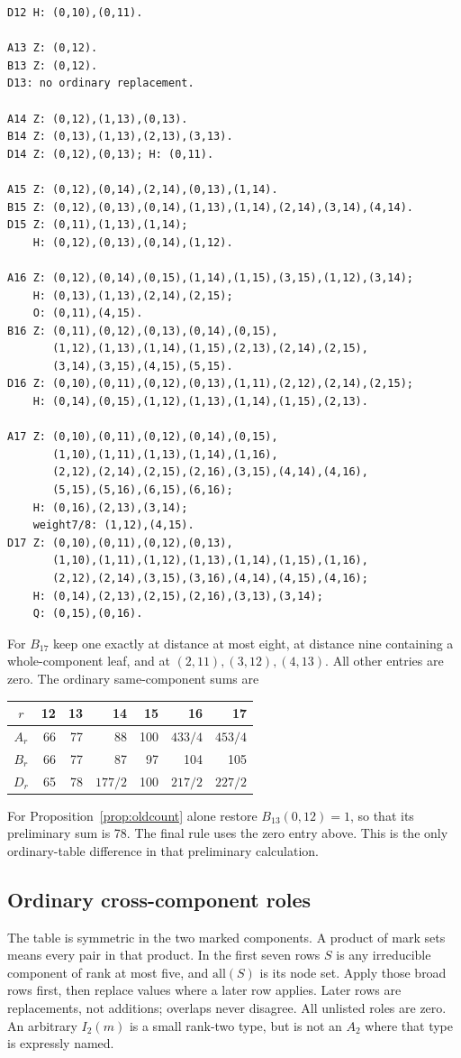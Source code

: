 \documentclass[11pt]{article}
\theoremstyle{remark}\newtheorem{remark}[theorem]{Remark}
\begin{document}
{\small
\begin{verbatim}
D12 H: (0,10),(0,11).

A13 Z: (0,12).
B13 Z: (0,12).
D13: no ordinary replacement.

A14 Z: (0,12),(1,13),(0,13).
B14 Z: (0,13),(1,13),(2,13),(3,13).
D14 Z: (0,12),(0,13); H: (0,11).

A15 Z: (0,12),(0,14),(2,14),(0,13),(1,14).
B15 Z: (0,12),(0,13),(0,14),(1,13),(1,14),(2,14),(3,14),(4,14).
D15 Z: (0,11),(1,13),(1,14);
    H: (0,12),(0,13),(0,14),(1,12).

A16 Z: (0,12),(0,14),(0,15),(1,14),(1,15),(3,15),(1,12),(3,14);
    H: (0,13),(1,13),(2,14),(2,15);
    O: (0,11),(4,15).
B16 Z: (0,11),(0,12),(0,13),(0,14),(0,15),
       (1,12),(1,13),(1,14),(1,15),(2,13),(2,14),(2,15),
       (3,14),(3,15),(4,15),(5,15).
D16 Z: (0,10),(0,11),(0,12),(0,13),(1,11),(2,12),(2,14),(2,15);
    H: (0,14),(0,15),(1,12),(1,13),(1,14),(1,15),(2,13).

A17 Z: (0,10),(0,11),(0,12),(0,14),(0,15),
       (1,10),(1,11),(1,13),(1,14),(1,16),
       (2,12),(2,14),(2,15),(2,16),(3,15),(4,14),(4,16),
       (5,15),(5,16),(6,15),(6,16);
    H: (0,16),(2,13),(3,14);
    weight7/8: (1,12),(4,15).
D17 Z: (0,10),(0,11),(0,12),(0,13),
       (1,10),(1,11),(1,12),(1,13),(1,14),(1,15),(1,16),
       (2,12),(2,14),(3,15),(3,16),(4,14),(4,15),(4,16);
    H: (0,14),(2,13),(2,15),(2,16),(3,13),(3,14);
    Q: (0,15),(0,16).
\end{verbatim}
}
For $B_{17}$ keep one exactly at distance at most eight, at
distance nine containing a whole-component leaf, and at
$(2,11),(3,12),(4,13)$. All other entries are zero.
The ordinary same-component sums are
\begin{center}
\begin{tabular}{c|rrrrrr}
$r$&12&13&14&15&16&17\\\hline
$A_r$&66&77&88&100&$433/4$&$453/4$\\
$B_r$&66&77&87&97&104&105\\
$D_r$&65&78&$177/2$&100&$217/2$&$227/2$
\end{tabular}
\end{center}
For Proposition~\ref{prop:oldcount} alone restore $B_{13}(0,12)=1$,
so that its preliminary sum is 78. The final rule uses the zero
entry above. This is the only ordinary-table difference in that
preliminary calculation.

\subsection{Ordinary cross-component roles}
The table is symmetric in the two marked components. A product
of mark sets means every pair in that product. In the first seven
rows $S$ is any irreducible component of rank at most five, and
$\mathrm{all}(S)$ is its node set. Apply those broad rows first,
then replace values where a later row applies. Later rows are
replacements, not additions; overlaps never disagree. All unlisted
roles are zero. An arbitrary $I_2(m)$ is a small rank-two type,
but is not an $A_2$ where that type is expressly named.
\end{document}
